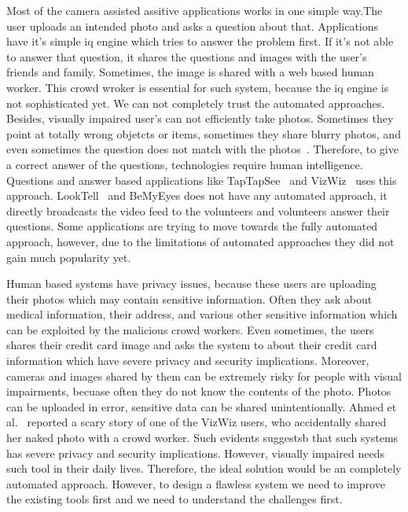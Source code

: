 \documentclass[sigconf]{acmart}
\begin{document}
Most of the camera assisted assitive applications works in one simple way.The user uploads an intended photo and asks a question about that. Applications have it's simple iq engine which tries to answer the problem first. If it's not able to answer that question, it shares the questions and images with the user's friends and family. Sometimes, the image is shared with a web based human worker. This crowd wroker is essential for such system, because the iq engine is not sophisticated yet. We can not completely trust the automated approaches.  Besides, visually impaired user's can not efficiently take photos. Sometimes they point at totally wrong objetcts or items, sometimes they share blurry photos, and even sometimes the question does not match with the photos~\cite{Jayant:2011,Bigham:2010,Harada:2013}. Therefore, to give a correct answer of the questions, technologies require human intelligence. Questions and answer based applications like TapTapSee~\cite{taptapsee} and VizWiz~\cite{Bigham:2010} uses this approach. LookTell~\cite{looktel} and BeMyEyes does not have any automated approach, it directly broadcasts the video feed to the volunteers and volunteers answer their questions. Some applications are trying to move towards the fully automated approach, however, due to the limitations of automated approaches they did not gain much popularity yet. 

Human based systems have privacy issues, because these users are uploading their photos which may contain sensitive information. Often they ask about medical information, their address, and various other sensitive information which can be exploited by the malicious crowd workers. Even sometimes, the users shares their credit card image and asks the system to about their credit card information which have severe privacy and security implications. Moreover, cameras and images shared by them can be extremely risky for people with visual impairments, becuase often they do not know the contents of the photo. Photos can be uploaded in error, sensitive data can be shared unintentionally. Ahmed et al.~\cite{Ahmed:2016} reported a scary story of one of the VizWiz users, who accidentally shared her naked photo with a crowd worker. Such evidents suggestsb that such systems has severe privacy and security implications. However, visually impaired needs such tool in their daily lives. Therefore, the ideal solution would be an completely automated approach. However, to design a flawless system we need to improve the existing tools first and we need to understand the challenges first.
\end{document}
